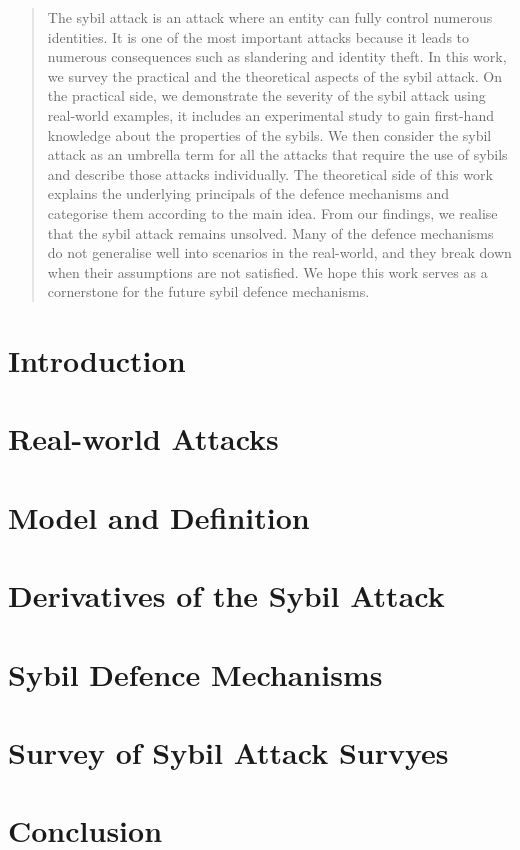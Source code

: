 \documentclass{sig-alternate-05-2015}
\begin{document}
\maketitle
\begin{abstract}
  The sybil attack is an attack where an entity can fully control numerous
  identities. It is one of the most important attacks because it leads to
  numerous consequences such as slandering and identity theft. In this work, we
  survey the practical and the theoretical aspects of the sybil attack. On the
  practical side, we demonstrate the severity of the sybil attack using
  real-world examples, it includes an experimental study to gain first-hand
  knowledge about the properties of the sybils. We then consider the sybil
  attack as an umbrella term for all the attacks that require the use of sybils
  and describe those attacks individually. The theoretical side of this work
  explains the underlying principals of the defence mechanisms and categorise
  them according to the main idea. From our findings, we realise that the sybil
  attack remains unsolved. Many of the defence mechanisms do not generalise well
  into scenarios in the real-world, and they break down when their assumptions
  are not satisfied. We hope this work serves as a cornerstone for the future
  sybil defence mechanisms.
\end{abstract}

\section{Introduction}\label{sec:intro}


\section{Real-world Attacks}\label{sec:motivation}


\section{Model and Definition}\label{sec:theory}


\section{Derivatives of the Sybil Attack}\label{sec:attacks}


\section{Sybil Defence Mechanisms}\label{sec:defences}


\section{Survey of Sybil Attack Survyes}\label{sec:related}


\section{Conclusion}\label{sec:summary}




\end{document}
